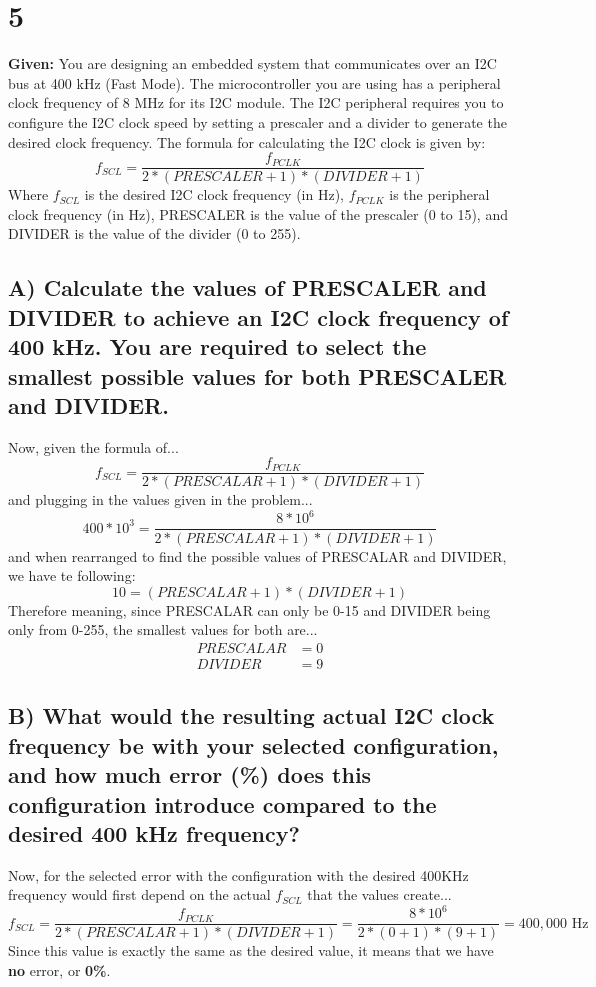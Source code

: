 \documentclass{article}
\begin{document}
\pagebreak
\section{5}
\textbf{Given:} You are designing an embedded system that communicates over an I2C bus at 400 kHz (Fast Mode). The
microcontroller you are using has a peripheral clock frequency of 8 MHz for its I2C module. The I2C peripheral requires you to configure the I2C clock speed by setting a prescaler and a divider to generate the desired clock frequency. The formula for calculating the I2C clock is given by:
$$ f_{SCL} = \frac{f_{PCLK}}{2*(PRESCALER+1)*(DIVIDER+1)} $$
Where $f_{SCL}$ is the desired I2C clock frequency (in Hz), $f_{PCLK}$ is the peripheral clock frequency (in Hz), PRESCALER is the value of the prescaler (0 to 15), and DIVIDER is the value of the divider (0 to 255).

\subsection{A) Calculate the values of PRESCALER and DIVIDER to achieve an I2C clock frequency of 400 kHz. You are required to select the smallest possible values for both PRESCALER and DIVIDER.}
Now, given the formula of...
$$ f_{SCL} = \frac{f_{PCLK}}{2*(PRESCALAR + 1)*(DIVIDER + 1)} $$
and plugging in the values given in the problem...
$$ 400*10^3 = \frac{8*10^6}{2*(PRESCALAR + 1)*(DIVIDER + 1)} $$
and when rearranged to find the possible values of PRESCALAR and DIVIDER, we have te following:
$$ 10 = (PRESCALAR + 1)*(DIVIDER + 1) $$
Therefore meaning, since PRESCALAR can only be 0-15 and DIVIDER being only from 0-255, the smallest values for both are...
\begin{align*}
PRESCALAR &= 0 \\
DIVIDER &= 9
\end{align*}

\subsection{B) What would the resulting actual I2C clock frequency be with your selected configuration, and how much error (\%) does this configuration introduce compared to the desired 400 kHz frequency?}
Now, for the selected error with the configuration with the desired 400KHz frequency would first depend on the actual $f_{SCL}$ that the values create...
$$ f_{SCL} = \frac{f_{PCLK}}{2*(PRESCALAR + 1)*(DIVIDER + 1)}  = \frac{8*10^6}{2*(0 + 1)*(9 + 1)} = 400,000\text{ Hz}$$
Since this value is exactly the same as the desired value, it means that we have \textbf{no} error, or \textbf{0\%}.
\end{document}
